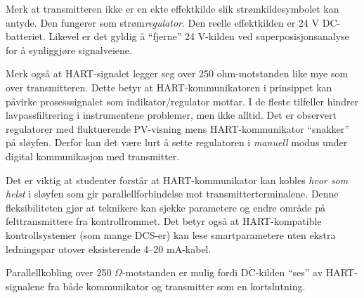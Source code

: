 





Merk at transmitteren ikke er en ekte effektkilde slik strømkildesymbolet kan antyde. Den fungerer som strøm{\it regulator}. Den reelle effektkilden er 24 V DC-batteriet. Likevel er det gyldig å ``fjerne'' 24 V-kilden ved superposisjonsanalyse for å synliggjøre signalveiene.

Merk også at HART-signalet legger seg over 250 ohm-motstanden like mye som over transmitteren. Dette betyr at HART-kommunikatoren i prinsippet kan påvirke prosesssignalet som indikator/regulator mottar. I de fleste tilfeller hindrer lavpassfiltrering i instrumentene problemer, men ikke alltid. Det er observert regulatorer med fluktuerende PV-visning mens HART-kommunikator ``snakker'' på sløyfen. Derfor kan det være lurt å sette regulatoren i {\it manuell} modus under digital kommunikasjon med transmitter.

\vskip 10pt

Det er viktig at studenter forstår at HART-kommunikator kan kobles {\it hvor som helst} i sløyfen som gir parallellforbindelse mot transmitterterminalene. Denne fleksibiliteten gjør at teknikere kan sjekke parametere og endre område på felttransmittere fra kontrollrommet. Det betyr også at HART-kompatible kontrollsystemer (som mange DCS-er) kan lese smartparametere uten ekstra ledningspar utover eksisterende 4--20 mA-kabel.

Parallellkobling over 250 $\Omega$-motstanden er mulig fordi DC-kilden ``ses'' av HART-signalene fra både kommunikator og transmitter som en kortslutning.


